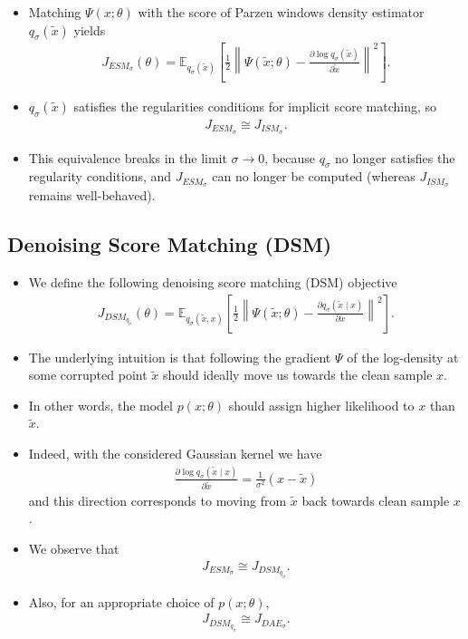 \documentclass[10pt]{article}
\newcommand{\EE}{\mathbb{E}}
\newcommand{\DAE}{J_{DAE_\sigma}}
\newcommand{\ESMP}{J_{ESM_\sigma}}
\newcommand{\ISMP}{J_{ISM_\sigma}}
\newcommand{\DSM}{J_{DSM_{q_\sigma}}}
\begin{document}
\begin{itemize}
\item Matching $\Psi(x;\theta)$ with the score of Parzen windows density estimator $q_\sigma(\tilde{x})$ yields
\begin{align*}
\ESMP(\theta) = \EE_{q_\sigma(\tilde{x})} \left[ \frac{1}{2} \left\| \Psi(\tilde{x};\theta) - \frac{\partial \log q_\sigma(\tilde{x})}{\partial \tilde{x}} \right\|^2 \right].
\end{align*}
\item $q_\sigma(\tilde{x})$ satisfies the regularities conditions for implicit score matching, so
\begin{align*}
\ESMP \cong \ISMP.
\end{align*}
\item This equivalence breaks in the limit $\sigma \rightarrow 0$, because $q_\sigma$ no longer satisfies the regularity conditions, and $\ESMP$ can no longer be computed (whereas $\ISMP$ remains well-behaved).
\end{itemize}

\subsection{Denoising Score Matching (DSM)}

\begin{itemize}
\item We define the following denoising score matching (DSM) objective
\begin{align*}
\DSM(\theta) = \EE_{q_\sigma(\tilde{x},x)} \left[ \frac{1}{2} \left\| \Psi(\tilde{x};\theta) - \frac{\partial q_\sigma(\tilde{x} \mid x)}{\partial x} \right\|^2 \right].
\end{align*}
\item The underlying intuition is that following the gradient $\Psi$ of the log-density at some corrupted point $\tilde{x}$ should ideally move us towards the clean sample $x$.
\item In other words, the model $p(x;\theta)$ should assign higher likelihood to $x$ than $\tilde{x}$.
\item Indeed, with the considered Gaussian kernel we have
\begin{align*}
\frac{\partial \log q_\sigma(\tilde{x} \mid x)}{\partial \tilde{x}} = \frac{1}{\sigma^2} (x - \tilde{x})
\end{align*}
and this direction corresponds to moving from $\tilde{x}$ back towards clean sample $x$.
\item We observe that
\begin{align*}
\ESMP \cong \DSM.
\end{align*}
\item Also, for an appropriate choice of $p(x;\theta)$,
\begin{align*}
\DSM \cong \DAE.
\end{align*}
\end{itemize}
\end{document}

